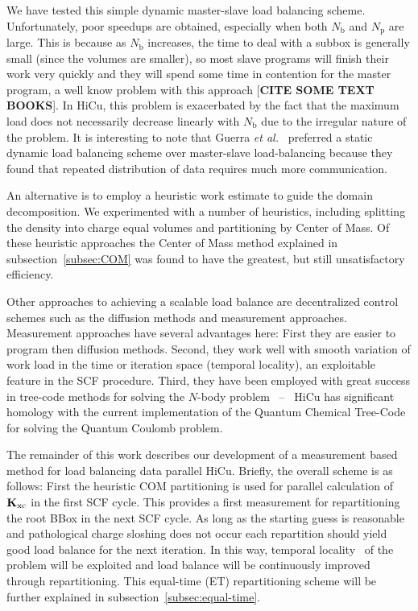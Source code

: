 \commentoutA{\documentclass[prb,aps,twocolumn,twocolumngrid]{revtex4}}
\newcommand{\Kxc}{{\bf K}_{\mathrm{xc}}}
\newcommand{\Np}{N_{\mathrm{p}}} \newcommand{\Nbox}{N_{\mathrm{b}}}
\begin{document}
We have tested this simple dynamic master-slave load balancing
scheme. Unfortunately, poor speedups are obtained, especially when
both $\Nbox$ and $\Np$ are large.  This is because as $\Nbox$
increases, the time to deal with a subbox is generally small (since
the volumes are smaller), so most slave programs will finish their
work very quickly and they will spend some time in contention for the
master program, a well know problem with this approach [{\bf CITE SOME TEXT BOOKS}].
In HiCu, this problem is exacerbated by the fact that the maximum load does not 
necessarily decrease linearly with $\Nbox$ due to the irregular nature of the problem.
It is interesting to note that Guerra {\it et al.}\/~\cite{Guerra_95}  preferred a
static dynamic load balancing scheme over  master-slave load-balancing  
because they found that repeated distribution of data requires much more 
communication.

An alternative is to employ a heuristic work estimate to guide the 
domain decomposition.  We experimented with a number
of heuristics, including  splitting the density into charge equal volumes and 
partitioning by Center of Mass.  Of these heuristic approaches the Center 
of Mass method explained in subsection~\ref{subsec:COM} was found to have 
the greatest, but still unsatisfactory efficiency.

Other approaches to achieving a scalable load balance are decentralized 
control schemes such as the diffusion methods \cite{} and measurement 
approaches.  Measurement approaches have several advantages here: First
they are easier to program then diffusion methods.  Second, they work 
well with smooth variation of work load in the time or iteration space 
(temporal locality), an exploitable feature in the SCF procedure.  Third, they have been employed 
with great success in tree-code methods for solving the $N$-body problem
\cite{JPilkington96,warren:92_article,Grama94_article,Warren95b,Singh93,Singh_95v27,Grama_98v24} ~--~
HiCu has significant homology with the current implementation of the 
Quantum Chemical Tree-Code for solving the Quantum Coulomb problem.

The remainder of this work describes our development of a measurement based
method for load balancing data parallel HiCu.  Briefly, the overall scheme is
as follows:  First the heuristic COM partitioning is used for parallel calculation 
of $\Kxc$ in the  first SCF cycle.   This provides a first measurement for repartitioning
the root BBox in the next SCF cycle.  As long as the starting guess is reasonable and 
pathological charge sloshing does not occur each repartition should yield good
load balance for the next iteration. In this way, temporal locality~\cite{JPilkington96} 
of the problem will be exploited and load balance will be continuously improved through 
repartitioning. This equal-time (ET) repartitioning scheme will be further explained in
subsection~\ref{subsec:equal-time}.
\end{document}
